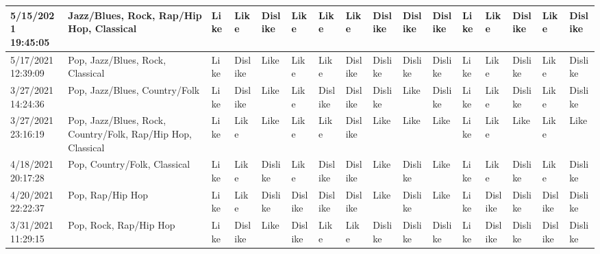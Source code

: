 \begin{table}
\begin{tabular}{|l|l|l|l|l|l|l|l|l|l|l|l|l|l|l|l|}
        5/15/2021 19:45:05 & Jazz/Blues, Rock, Rap/Hip Hop, Classical & Like & Like & Dislike & Like & Like & Like & Dislike & Dislike & Dislike & Like & Like & Dislike & Like & Dislike \\ \hline
        5/17/2021 12:39:09 & Pop, Jazz/Blues, Rock, Classical & Like & Dislike & Like & Like & Like & Dislike & Dislike & Dislike & Dislike & Like & Like & Dislike & Like & Dislike \\ \hline
        3/27/2021 14:24:36 & Pop, Jazz/Blues, Country/Folk & Like & Dislike & Like & Like & Dislike & Dislike & Dislike & Like & Dislike & Like & Like & Dislike & Like & Dislike \\ \hline
        3/27/2021 23:16:19 & Pop, Jazz/Blues, Rock, Country/Folk, Rap/Hip Hop, Classical & Like & Like & Like & Like & Like & Dislike & Like & Like & Like & Like & Like & Like & Like & Like \\ \hline
        4/18/2021 20:17:28 & Pop, Country/Folk, Classical & Like & Like & Dislike & Like & Dislike & Dislike & Like & Dislike & Like & Like & Like & Dislike & Like & Dislike \\ \hline
        4/20/2021 22:22:37 & Pop, Rap/Hip Hop & Like & Like & Dislike & Dislike & Dislike & Dislike & Like & Dislike & Like & Like & Dislike & Dislike & Dislike & Dislike \\ \hline
        3/31/2021 11:29:15 & Pop, Rock, Rap/Hip Hop & Like & Dislike & Like & Dislike & Like & Like & Dislike & Dislike & Dislike & Like & Dislike & Dislike & Dislike & Dislike \\ \hline
    \end{tabular}
\end{table}
